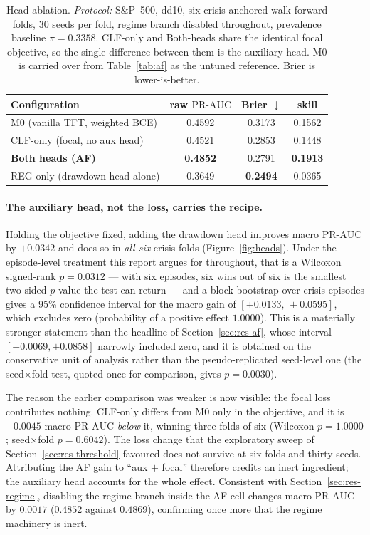 \documentclass[11pt,a4paper]{article}
\newcommand{\prauc}{\mbox{PR-AUC}}
\begin{document}
\begin{table}[h]
\centering\small
\caption{Head ablation. \emph{Protocol:} S\&P~500, dd10, six crisis-anchored
walk-forward folds, 30 seeds per fold, regime branch disabled throughout,
prevalence baseline $\pi=0.3358$. CLF-only and Both-heads share the identical
focal objective, so the single difference between them is the auxiliary head.
M0 is carried over from Table~\ref{tab:af} as the untuned reference. Brier is
lower-is-better.}
\label{tab:heads}
\begin{tabular}{lccc}
\toprule
Configuration & raw $\prauc$ & Brier $\downarrow$ & skill \\
\midrule
M0 (vanilla TFT, weighted BCE)   & 0.4592 & 0.3173 & 0.1562 \\
CLF-only (focal, no aux head)    & 0.4521 & 0.2853 & 0.1448 \\
\textbf{Both heads (AF)}         & \textbf{0.4852} & 0.2791 & \textbf{0.1913} \\
REG-only (drawdown head alone)   & 0.3649 & \textbf{0.2494} & 0.0365 \\
\bottomrule
\end{tabular}
\end{table}

\paragraph{The auxiliary head, not the loss, carries the recipe.} Holding the
objective fixed, adding the drawdown head improves macro $\prauc$ by
$+0.0342$ and does so in \emph{all six} crisis folds
(Figure~\ref{fig:heads}). Under the episode-level treatment this report argues
for throughout, that is a Wilcoxon signed-rank $p=0.0312$ --- with six
episodes, six wins out of six is the smallest two-sided $p$-value the test can
return --- and a block bootstrap over crisis episodes gives a 95\% confidence
interval for the macro gain of $[+0.0133,\,+0.0595]$, which excludes zero
(probability of a positive effect $1.0000$). This is a materially stronger
statement than the headline of Section~\ref{sec:res-af}, whose interval
$[-0.0069,+0.0858]$ narrowly included zero, and it is obtained on the
conservative unit of analysis rather than the pseudo-replicated seed-level one
(the seed$\times$fold test, quoted once for comparison, gives $p=0.0030$).

The reason the earlier comparison was weaker is now visible: the focal loss
contributes nothing. CLF-only differs from M0 only in the objective, and it is
$-0.0045$ macro $\prauc$ \emph{below} it, winning three folds of six
(Wilcoxon $p=1.0000$; seed$\times$fold $p=0.6042$). The loss change that the
exploratory sweep of Section~\ref{sec:res-threshold} favoured does not survive at six
folds and thirty seeds. Attributing the AF gain to ``aux $+$ focal'' therefore
credits an inert ingredient; the auxiliary head accounts for the whole effect.
Consistent with Section~\ref{sec:res-regime}, disabling the regime branch inside
the AF cell changes macro $\prauc$ by $0.0017$ ($0.4852$ against $0.4869$),
confirming once more that the regime machinery is inert.
\end{document}
